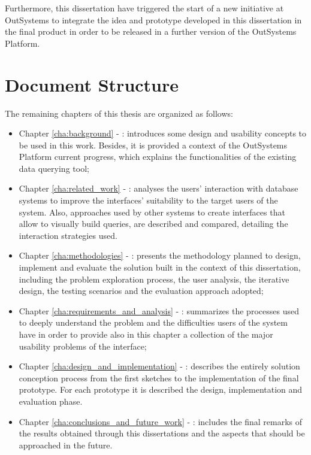 Furthermore, this dissertation have triggered the start of a new initiative at OutSystems to integrate the idea and prototype developed in this dissertation in the final product in order to be released in a further version of the OutSystems Platform.

\section{Document Structure}
\label{sec:document_structure}

The remaining chapters of this thesis are organized as follows:

\begin{itemize}
  \item Chapter \ref{cha:background} - : introduces some design and usability concepts to be used in this work. Besides, it is provided a context of the OutSystems Platform current progress, which explains the functionalities of the existing data querying tool;
  \item Chapter \ref{cha:related_work} - : analyses the users' interaction with database systems to improve the interfaces' suitability to the target users of the system. Also, approaches used by other systems to create interfaces that allow to visually build queries, are described and compared, detailing the interaction strategies used.
  \item Chapter \ref{cha:methodologies} - : presents the methodology planned to design, implement and evaluate the solution built in the context of this dissertation, including the problem exploration process, the user analysis, the iterative design, the testing scenarios and the evaluation approach adopted;
  \item Chapter \ref{cha:requirements_and_analysis} - : summarizes the processes used to deeply understand the problem and the difficulties users of the system have in order to provide also in this chapter a collection of the major usability problems of the interface;
  \item Chapter \ref{cha:design_and_implementation} - : describes the entirely solution conception process from the first sketches to the implementation of the final prototype. For each prototype it is described the design, implementation and evaluation phase.
  \item Chapter \ref{cha:conclusions_and_future_work} - : includes the final remarks of the results obtained through this dissertations and the aspects that should be approached in the future.
\end{itemize}
